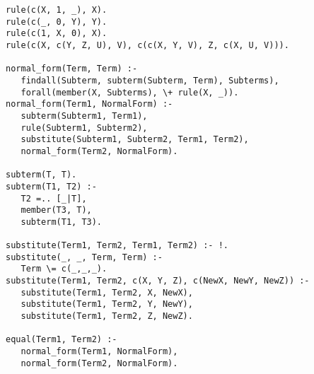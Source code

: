 \documentclass[a4paper,twoside,openright]{report}
\begin{document}
\begin{verbatim}
rule(c(X, 1, _), X).
rule(c(_, 0, Y), Y).
rule(c(1, X, 0), X).
rule(c(X, c(Y, Z, U), V), c(c(X, Y, V), Z, c(X, U, V))).

normal_form(Term, Term) :-
   findall(Subterm, subterm(Subterm, Term), Subterms),
   forall(member(X, Subterms), \+ rule(X, _)).
normal_form(Term1, NormalForm) :-
   subterm(Subterm1, Term1),
   rule(Subterm1, Subterm2),
   substitute(Subterm1, Subterm2, Term1, Term2),
   normal_form(Term2, NormalForm).

subterm(T, T).
subterm(T1, T2) :-
   T2 =.. [_|T],
   member(T3, T),
   subterm(T1, T3).

substitute(Term1, Term2, Term1, Term2) :- !.
substitute(_, _, Term, Term) :-
   Term \= c(_,_,_).
substitute(Term1, Term2, c(X, Y, Z), c(NewX, NewY, NewZ)) :-
   substitute(Term1, Term2, X, NewX),
   substitute(Term1, Term2, Y, NewY),
   substitute(Term1, Term2, Z, NewZ).

equal(Term1, Term2) :-
   normal_form(Term1, NormalForm),
   normal_form(Term2, NormalForm).
\end{verbatim}







\end{document}
